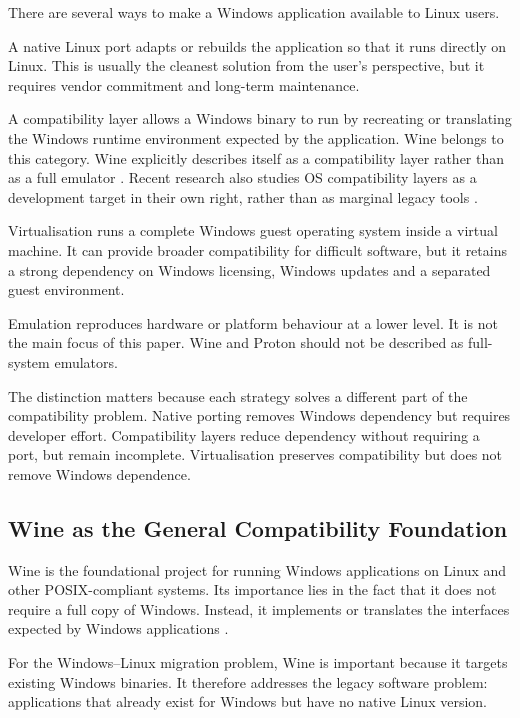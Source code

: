 \documentclass[conference]{IEEEtran}
\begin{document}
There are several ways to make a Windows application available to Linux users.

A native Linux port adapts or rebuilds the application so that it runs directly on Linux. This is usually the cleanest solution from the user's perspective, but it requires vendor commitment and long-term maintenance.

A compatibility layer allows a Windows binary to run by recreating or translating the Windows runtime environment expected by the application. Wine belongs to this category. Wine explicitly describes itself as a compatibility layer rather than as a full emulator \cite{winehqAbout}. Recent research also studies OS compatibility layers as a development target in their own right, rather than as marginal legacy tools \cite{lefeuvre2023loupe}.

Virtualisation runs a complete Windows guest operating system inside a virtual machine. It can provide broader compatibility for difficult software, but it retains a strong dependency on Windows licensing, Windows updates and a separated guest environment.

Emulation reproduces hardware or platform behaviour at a lower level. It is not the main focus of this paper. Wine and Proton should not be described as full-system emulators.

The distinction matters because each strategy solves a different part of the compatibility problem. Native porting removes Windows dependency but requires developer effort. Compatibility layers reduce dependency without requiring a port, but remain incomplete. Virtualisation preserves compatibility but does not remove Windows dependence.

\subsection{Wine as the General Compatibility Foundation}

Wine is the foundational project for running Windows applications on Linux and other POSIX-compliant systems. Its importance lies in the fact that it does not require a full copy of Windows. Instead, it implements or translates the interfaces expected by Windows applications \cite{winehqAbout}.

For the Windows--Linux migration problem, Wine is important because it targets existing Windows binaries. It therefore addresses the legacy software problem: applications that already exist for Windows but have no native Linux version.
\end{document}
